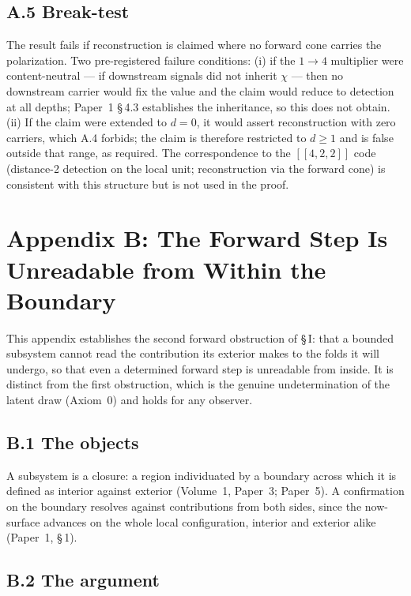 \documentclass[11pt,oneside]{report}
\theoremstyle{definition}
\theoremstyle{remark}
\begin{document}
\subsection*{A.5 Break-test}

The result fails if reconstruction is claimed where no forward cone
carries the polarization. Two pre-registered failure conditions: (i) if
the \ensuremath{1\to 4} multiplier were content-neutral --- if downstream
signals did not inherit \ensuremath{\chi} --- then no downstream carrier
would fix the value and the claim would reduce to detection at all depths;
Paper~1 \S\,4.3 establishes the inheritance, so this does not obtain. (ii)
If the claim were extended to \ensuremath{d = 0}, it would assert
reconstruction with zero carriers, which A.4 forbids; the claim is
therefore restricted to \ensuremath{d \geq 1} and is false outside that
range, as required. The correspondence to the \ensuremath{[[4,2,2]]} code
(distance-2 detection on the local unit; reconstruction via the forward
cone) is consistent with this structure but is not used in the proof.

\section*{Appendix B: The Forward Step Is Unreadable from Within the Boundary}

This appendix establishes the second forward obstruction of \S\,I: that a
bounded subsystem cannot read the contribution its exterior makes to the
folds it will undergo, so that even a determined forward step is
unreadable from inside. It is distinct from the first obstruction, which
is the genuine undetermination of the latent draw (Axiom~0) and holds for
any observer.

\subsection*{B.1 The objects}

A subsystem is a closure: a region individuated by a boundary across which
it is defined as interior against exterior (Volume~1, Paper~3; Paper~5).
A confirmation on the boundary resolves against contributions from both
sides, since the now-surface advances on the whole local configuration,
interior and exterior alike (Paper~1, \S\,1).

\subsection*{B.2 The argument}
\end{document}
